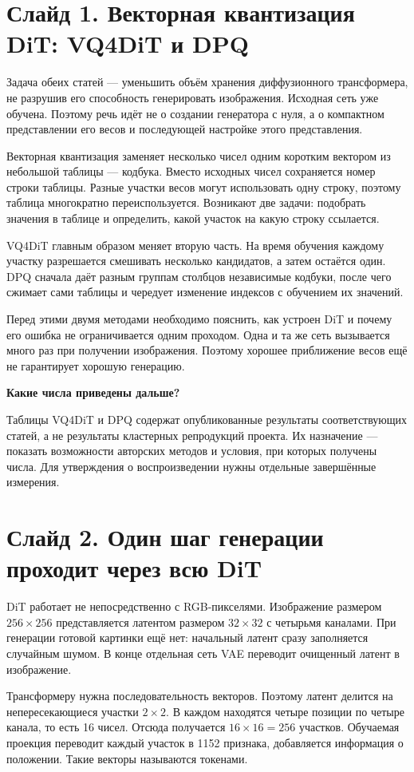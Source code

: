 \documentclass[a4paper,11pt]{article}
\newcommand{\slide}[2]{\clearpage\section*{Слайд #1. #2}}
\newcommand{\question}[1]{\par\textbf{#1}\par}
\begin{document}
\slide{1}{Векторная квантизация DiT: VQ4DiT и DPQ}
Задача обеих статей --- уменьшить объём хранения диффузионного трансформера,
не разрушив его способность генерировать изображения. Исходная сеть уже
обучена. Поэтому речь идёт не о создании генератора с нуля, а о компактном
представлении его весов и последующей настройке этого представления.

Векторная квантизация заменяет несколько чисел одним коротким вектором
из небольшой таблицы --- кодбука. Вместо исходных чисел сохраняется номер
строки таблицы. Разные участки весов могут использовать одну строку, поэтому
таблица многократно переиспользуется. Возникают две задачи: подобрать значения
в таблице и определить, какой участок на какую строку ссылается.

VQ4DiT главным образом меняет вторую часть. На время обучения каждому
участку разрешается смешивать несколько кандидатов, а затем остаётся один.
DPQ сначала даёт разным группам столбцов независимые кодбуки, после чего
сжимает сами таблицы и чередует изменение индексов с обучением их значений.

Перед этими двумя методами необходимо пояснить, как устроен DiT и почему
его ошибка не ограничивается одним проходом. Одна и та же сеть вызывается
много раз при получении изображения. Поэтому хорошее приближение весов
ещё не гарантирует хорошую генерацию.

\question{Какие числа приведены дальше?}
Таблицы VQ4DiT и DPQ содержат опубликованные результаты соответствующих
статей, а не результаты кластерных репродукций проекта. Их назначение ---
показать возможности авторских методов и условия, при которых получены числа.
Для утверждения о воспроизведении нужны отдельные завершённые измерения.

\slide{2}{Один шаг генерации проходит через всю DiT}
DiT работает не непосредственно с RGB-пикселями. Изображение размером
$256\times256$ представляется латентом размером $32\times32$ с четырьмя
каналами. При генерации готовой картинки ещё нет: начальный латент сразу
заполняется случайным шумом. В конце отдельная сеть VAE переводит очищенный
латент в изображение.

Трансформеру нужна последовательность векторов. Поэтому латент делится
на непересекающиеся участки $2\times2$. В каждом находятся четыре позиции
по четыре канала, то есть 16 чисел. Отсюда получается $16\times16=256$
участков. Обучаемая проекция переводит каждый участок в 1152 признака,
добавляется информация о положении. Такие векторы называются токенами.
\end{document}
